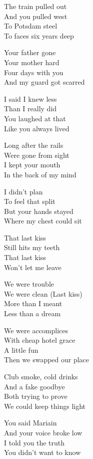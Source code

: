 \begin{lyrics}
The train pulled out\\
And you pulled west\\
To Potsdam steel\\
To faces six years deep

Your father gone\\
Your mother hard\\
Four days with you\\
And my guard got scarred

I said I knew less\\
Than I really did\\
You laughed at that\\
Like you always lived

Long after the rails\\
Were gone from sight\\
I kept your mouth\\
In the back of my mind

I didn't plan\\
To feel that split\\
But your hands stayed\\
Where my chest could sit

That last kiss\\
Still hits my teeth\\
That last kiss\\
Won't let me leave

We were trouble\\
We were clean
(Last kiss)\\
More than I meant\\
Less than a dream

We were accomplices\\
With cheap hotel grace\\
A little fun\\
Then we swapped our place

Club smoke, cold drinks\\
And a fake goodbye\\
Both trying to prove\\
We could keep things light

You said Mariain\\
And your voice broke low\\
I told you the truth\\
You didn't want to know


\end{lyrics}
